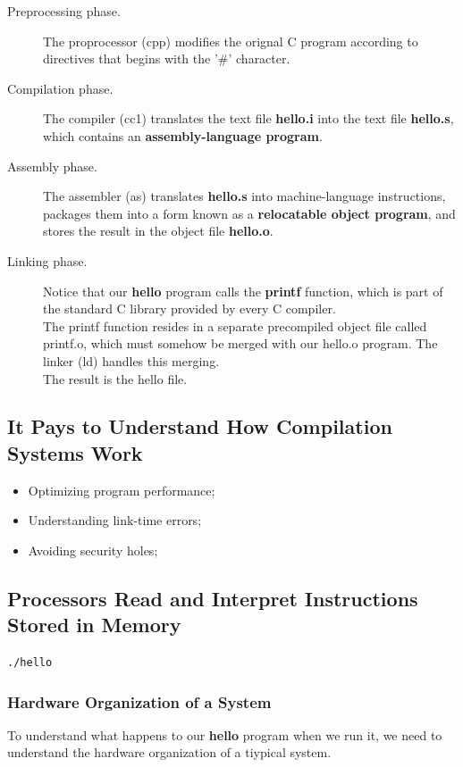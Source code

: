 \documentclass[11pt]{article}
\begin{document}
\begin{description}
\item[{Preprocessing phase.}] The proprocessor (cpp) modifies the orignal C program according to directives that begins with the '\#' character.\\
\item[{Compilation phase.}] The compiler (cc1) translates the text file \textbf{hello.i} into the text file \textbf{hello.s}, which contains an \textbf{assembly-language program}.\\
\item[{Assembly phase.}] The assembler (as) translates \textbf{hello.s} into machine-language instructions, packages them into a form known as a \textbf{relocatable object program}, and stores the result in the object file \textbf{hello.o}.\\
\item[{Linking phase.}] Notice that our \textbf{hello} program calls the \textbf{printf} function, which is part of the standard C library provided by every C compiler.\\
The printf function resides in a separate precompiled object file called printf.o, which must somehow be merged with our hello.o program. The linker (ld) handles this merging.\\
The result is the hello file.\\
\end{description}


\subsection{It Pays to Understand How Compilation Systems Work}
\label{sec:orgbbf3597}
\begin{itemize}
\item Optimizing program performance;\\
\item Understanding link-time errors;\\
\item Avoiding security holes;\\
\end{itemize}
\subsection{Processors Read and Interpret Instructions Stored in Memory}
\label{sec:org6c30276}
\begin{verbatim}
./hello
\end{verbatim}
\subsubsection{Hardware Organization of a System}
\label{sec:org3053715}
To understand what happens to our \textbf{hello} program when we run it, we need to understand the hardware organization of a tiypical system.\\
\end{document}
